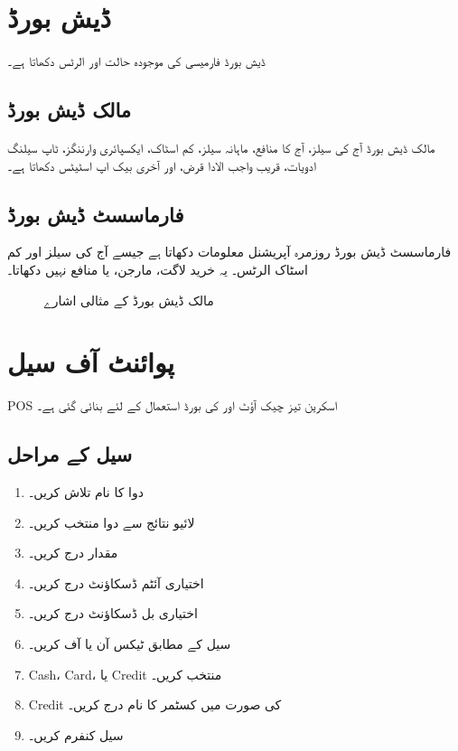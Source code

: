 \documentclass[12pt,a4paper]{article}
\begin{document}
\section{ڈیش بورڈ}
ڈیش بورڈ فارمیسی کی موجودہ حالت اور الرٹس دکھاتا ہے۔

\subsection{مالک ڈیش بورڈ}
مالک ڈیش بورڈ آج کی سیلز، آج کا منافع، ماہانہ سیلز، کم اسٹاک، ایکسپائری وارننگز، ٹاپ سیلنگ ادویات، قریب واجب الادا قرض، اور آخری بیک اپ اسٹیٹس دکھاتا ہے۔

\subsection{فارماسسٹ ڈیش بورڈ}
فارماسسٹ ڈیش بورڈ روزمرہ آپریشنل معلومات دکھاتا ہے جیسے آج کی سیلز اور کم اسٹاک الرٹس۔ یہ خرید لاگت، مارجن، یا منافع نہیں دکھاتا۔

\begin{figure}[H]
\centering
{}
\caption{مالک ڈیش بورڈ کے مثالی اشارے}
\end{figure}

\section{پوائنٹ آف سیل}
POS اسکرین تیز چیک آؤٹ اور کی بورڈ استعمال کے لئے بنائی گئی ہے۔

\subsection{سیل کے مراحل}
\begin{enumerate}
  \item دوا کا نام تلاش کریں۔
  \item لائیو نتائج سے دوا منتخب کریں۔
  \item مقدار درج کریں۔
  \item اختیاری آئٹم ڈسکاؤنٹ درج کریں۔
  \item اختیاری بل ڈسکاؤنٹ درج کریں۔
  \item سیل کے مطابق ٹیکس آن یا آف کریں۔
  \item Cash، Card، یا Credit منتخب کریں۔
  \item Credit کی صورت میں کسٹمر کا نام درج کریں۔
  \item سیل کنفرم کریں۔
\end{enumerate}
\end{document}
